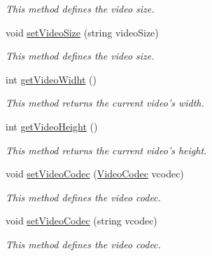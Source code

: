 \begin{DoxyCompactItemize}
\begin{DoxyCompactList}\small\item\em This method defines the video size. \item\end{DoxyCompactList}\item 
void \hyperlink{classbr_1_1ufscar_1_1lince_1_1streaming_1_1AVEncoder_ad5d69bfba46eea0dfc3105d7fe592191}{setVideoSize} (string videoSize)
\begin{DoxyCompactList}\small\item\em This method defines the video size. \item\end{DoxyCompactList}\item 
int \hyperlink{classbr_1_1ufscar_1_1lince_1_1streaming_1_1AVEncoder_a3f0b53ccd6c240ba2302c8278129f490}{getVideoWidht} ()
\begin{DoxyCompactList}\small\item\em This method returns the current video's width. \item\end{DoxyCompactList}\item 
int \hyperlink{classbr_1_1ufscar_1_1lince_1_1streaming_1_1AVEncoder_a8a215c772aa7cdd6aec86537a0980e2d}{getVideoHeight} ()
\begin{DoxyCompactList}\small\item\em This method returns the current video's height. \item\end{DoxyCompactList}\item 
void \hyperlink{classbr_1_1ufscar_1_1lince_1_1streaming_1_1AVEncoder_aece976fc8feb135ee127ae3d2c7d5115}{setVideoCodec} (\hyperlink{namespacebr_1_1ufscar_1_1lince_1_1streaming_ae620b1e02bc9a1ad45d6e10cd1f87693}{VideoCodec} vcodec)
\begin{DoxyCompactList}\small\item\em This method defines the video codec. \item\end{DoxyCompactList}\item 
void \hyperlink{classbr_1_1ufscar_1_1lince_1_1streaming_1_1AVEncoder_abeb4f6a9e0fd63048e57dd7c6ef12de9}{setVideoCodec} (string vcodec)
\begin{DoxyCompactList}\small\item\em This method defines the video codec. \item\end{DoxyCompactList}\item 

\end{DoxyCompactItemize}
